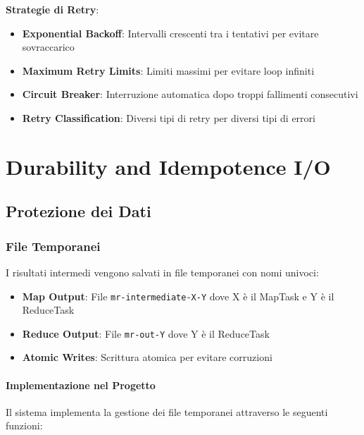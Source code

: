 \documentclass[12pt,a4paper]{article}
\begin{document}
\textbf{Strategie di Retry}:
\begin{itemize}
\item \textbf{Exponential Backoff}: Intervalli crescenti tra i tentativi per evitare sovraccarico
\item \textbf{Maximum Retry Limits}: Limiti massimi per evitare loop infiniti
\item \textbf{Circuit Breaker}: Interruzione automatica dopo troppi fallimenti consecutivi
\item \textbf{Retry Classification}: Diversi tipi di retry per diversi tipi di errori
\end{itemize}

\section{Durability and Idempotence I/O}

\subsection{Protezione dei Dati}

\subsubsection{File Temporanei}

I risultati intermedi vengono salvati in file temporanei con nomi univoci:

\begin{itemize}
\item \textbf{Map Output}: File \texttt{mr-intermediate-X-Y} dove X è il MapTask e Y è il ReduceTask
\item \textbf{Reduce Output}: File \texttt{mr-out-Y} dove Y è il ReduceTask
\item \textbf{Atomic Writes}: Scrittura atomica per evitare corruzioni
\end{itemize}

\paragraph{Implementazione nel Progetto}

Il sistema implementa la gestione dei file temporanei attraverso le seguenti funzioni:
\end{document}
